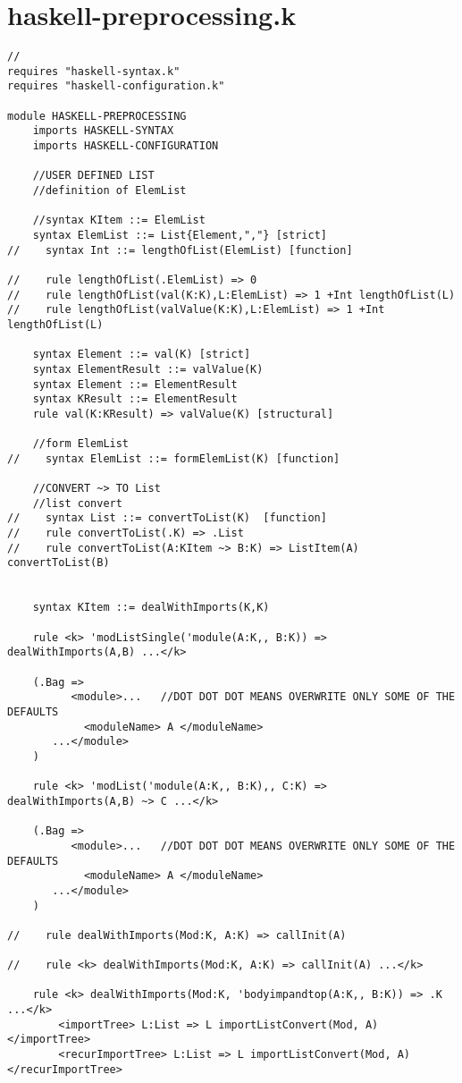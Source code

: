 \chapter{haskell-preprocessing.k}
\begin{lstlisting}
//
requires "haskell-syntax.k"
requires "haskell-configuration.k"

module HASKELL-PREPROCESSING
    imports HASKELL-SYNTAX
    imports HASKELL-CONFIGURATION

    //USER DEFINED LIST
    //definition of ElemList

    //syntax KItem ::= ElemList
    syntax ElemList ::= List{Element,","} [strict]
//    syntax Int ::= lengthOfList(ElemList) [function]

//    rule lengthOfList(.ElemList) => 0
//    rule lengthOfList(val(K:K),L:ElemList) => 1 +Int lengthOfList(L)
//    rule lengthOfList(valValue(K:K),L:ElemList) => 1 +Int lengthOfList(L)

    syntax Element ::= val(K) [strict]
    syntax ElementResult ::= valValue(K)
    syntax Element ::= ElementResult
    syntax KResult ::= ElementResult
    rule val(K:KResult) => valValue(K) [structural]

    //form ElemList
//    syntax ElemList ::= formElemList(K) [function]

    //CONVERT ~> TO List
    //list convert
//    syntax List ::= convertToList(K)  [function]
//    rule convertToList(.K) => .List
//    rule convertToList(A:KItem ~> B:K) => ListItem(A) convertToList(B)


    syntax KItem ::= dealWithImports(K,K)

    rule <k> 'modListSingle('module(A:K,, B:K)) => dealWithImports(A,B) ...</k>

    (.Bag =>
          <module>...   //DOT DOT DOT MEANS OVERWRITE ONLY SOME OF THE DEFAULTS
    	    <moduleName> A </moduleName>
       ...</module>
    )

    rule <k> 'modList('module(A:K,, B:K),, C:K) => dealWithImports(A,B) ~> C ...</k>

    (.Bag =>
          <module>...   //DOT DOT DOT MEANS OVERWRITE ONLY SOME OF THE DEFAULTS
    	    <moduleName> A </moduleName>
       ...</module>
    )

//    rule dealWithImports(Mod:K, A:K) => callInit(A)

//    rule <k> dealWithImports(Mod:K, A:K) => callInit(A) ...</k>

    rule <k> dealWithImports(Mod:K, 'bodyimpandtop(A:K,, B:K)) => .K ...</k>
        <importTree> L:List => L importListConvert(Mod, A) </importTree>
        <recurImportTree> L:List => L importListConvert(Mod, A) </recurImportTree>


\end{lstlisting}
